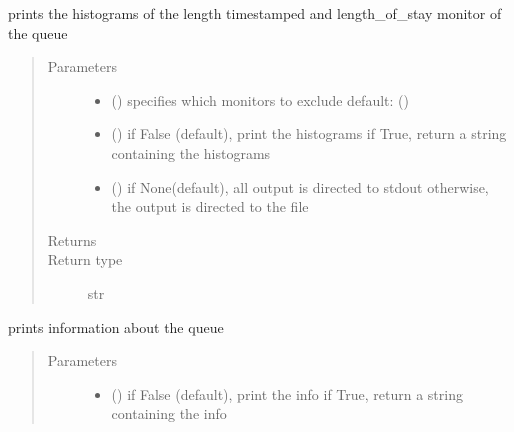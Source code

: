 \documentclass[letterpaper,10pt,english]{sphinxmanual}
\begin{document}
\begin{fulllineitems}

\begin{fulllineitems}
\label{\detokenize{Reference:salabim.Queue.print_histograms}}
prints the histograms of the length timestamped and length\_of\_stay monitor of the queue
\begin{quote}\begin{description}
\item[{Parameters}] \leavevmode\begin{itemize}
\item {} 
 () \textendash{} specifies which monitors to exclude 
default: () 

\item {} 
 () \textendash{} if False (default), print the histograms
if True, return a string containing the histograms

\item {} 
 () \textendash{} if None(default), all output is directed to stdout 
otherwise, the output is directed to the file

\end{itemize}

\item[{Returns}] \leavevmode
{}

\item[{Return type}] \leavevmode
str

\end{description}\end{quote}

\end{fulllineitems}


\begin{fulllineitems}
\label{\detokenize{Reference:salabim.Queue.print_info}}
prints information about the queue
\begin{quote}\begin{description}
\item[{Parameters}] \leavevmode\begin{itemize}
\item {} 
 () \textendash{} if False (default), print the info
if True, return a string containing the info


\end{itemize}
\end{description}
\end{quote}
\end{fulllineitems}
\end{fulllineitems}
\end{document}
